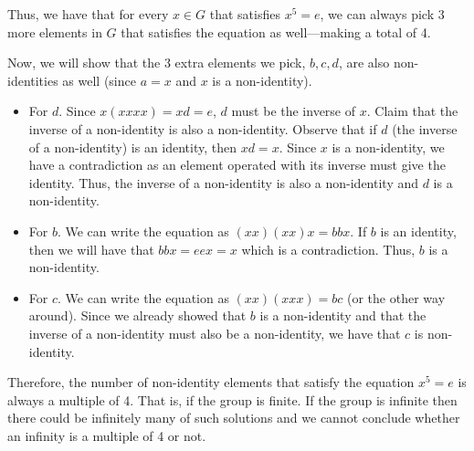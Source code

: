 \begin{hwproblem}
Thus, we have that for every \(x \in G\) that satisfies \(x^5 = e\), we can always pick 3 more elements in \(G\) that satisfies the equation as well---making a total of 4.

Now, we will show that the 3 extra elements we pick, \(b, c, d\), are also non-identities as well (since \(a = x\) and \(x\) is a non-identity).
\begin{itemize}
    \item For \(d\). Since \(x(xxxx) = xd = e\), \(d\) must be the inverse of \(x\). Claim that the inverse of a non-identity is also a non-identity. Observe that if \(d\) (the inverse of a non-identity) is an identity, then \(xd = x\). Since \(x\) is a non-identity, we have a contradiction as an element operated with its inverse must give the identity. Thus, the inverse of a non-identity is also a non-identity and \(d\) is a non-identity.
    \item For \(b\). We can write the equation as \((xx)(xx)x = bbx\). If \(b\) is an identity, then we will have that \(bbx = eex = x\) which is a contradiction. Thus, \(b\) is a non-identity.
    \item For \(c\). We can write the equation as \((xx)(xxx) = bc\) (or the other way around). Since we already showed that \(b\) is a non-identity and that the inverse of a non-identity must also be a non-identity, we have that \(c\) is non-identity.
\end{itemize}

Therefore, the number of non-identity elements that satisfy the equation \(x^5 = e\) is always a multiple of 4. That is, if the group is finite. If the group is infinite then there could be infinitely many of such solutions and we cannot conclude whether an infinity is a multiple of 4 or not.
\end{hwproblem}

